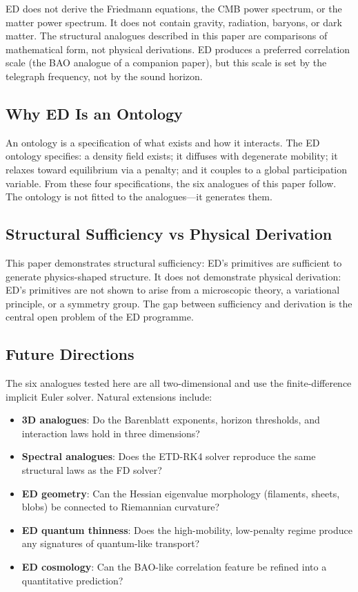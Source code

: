 \documentclass[11pt]{article}
\begin{document}
ED does not derive the Friedmann equations, the CMB power spectrum, or the matter power spectrum. It does not contain gravity, radiation, baryons, or dark matter. The structural analogues described in this paper are comparisons of mathematical form, not physical derivations. ED produces a preferred correlation scale (the BAO analogue of a companion paper), but this scale is set by the telegraph frequency, not by the sound horizon.

\subsection{Why ED Is an Ontology}

An ontology is a specification of what exists and how it interacts. The ED ontology specifies: a density field exists; it diffuses with degenerate mobility; it relaxes toward equilibrium via a penalty; and it couples to a global participation variable. From these four specifications, the six analogues of this paper follow. The ontology is not fitted to the analogues---it generates them.

\subsection{Structural Sufficiency vs Physical Derivation}

This paper demonstrates structural sufficiency: ED's primitives are sufficient to generate physics-shaped structure. It does not demonstrate physical derivation: ED's primitives are not shown to arise from a microscopic theory, a variational principle, or a symmetry group. The gap between sufficiency and derivation is the central open problem of the ED programme.

\subsection{Future Directions}

The six analogues tested here are all two-dimensional and use the finite-difference implicit Euler solver. Natural extensions include:
\begin{itemize}
  \item \textbf{3D analogues}: Do the Barenblatt exponents, horizon thresholds, and interaction laws hold in three dimensions?
  \item \textbf{Spectral analogues}: Does the ETD-RK4 solver reproduce the same structural laws as the FD solver?
  \item \textbf{ED geometry}: Can the Hessian eigenvalue morphology (filaments, sheets, blobs) be connected to Riemannian curvature?
  \item \textbf{ED quantum thinness}: Does the high-mobility, low-penalty regime produce any signatures of quantum-like transport?
  \item \textbf{ED cosmology}: Can the BAO-like correlation feature be refined into a quantitative prediction?
\end{itemize}
\end{document}
